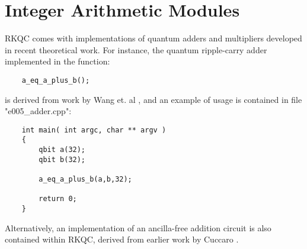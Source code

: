 \section{Integer Arithmetic Modules}

RKQC comes with implementations of quantum adders and multipliers developed in recent theoretical work. For instance, the quantum ripple-carry adder implemented in the function: 

\begin{lstlisting}
    a_eq_a_plus_b();
\end{lstlisting}

is derived from work by Wang et. al \cite{adder}, and an example of usage is contained in file "e005\_adder.cpp": 

\begin{lstlisting}
    int main( int argc, char ** argv )
    {
        qbit a(32);
        qbit b(32);
    
        a_eq_a_plus_b(a,b,32);
    
        return 0;
    }
\end{lstlisting}

Alternatively, an implementation of an ancilla-free addition circuit is also contained within RKQC, derived from earlier work by Cuccaro \cite{Cuccaro}. 
